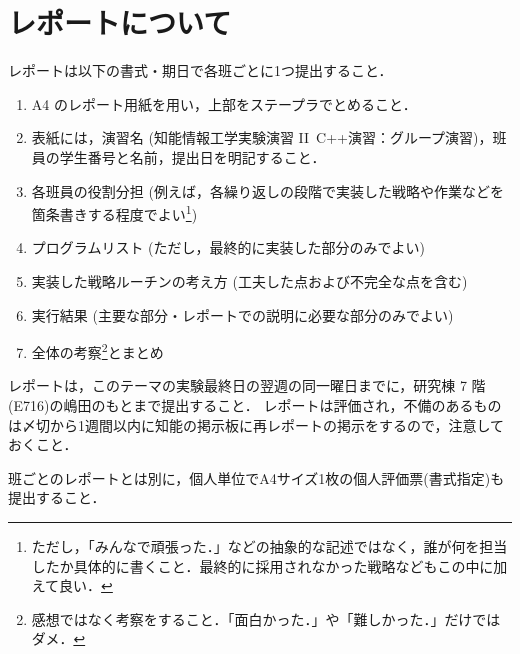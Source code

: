 \section{レポートについて}
レポートは以下の書式・期日で各班ごとに1つ提出すること．
\begin{enumerate}
 \item A4 のレポート用紙を用い，上部をステープラでとめること．\vspace*{-0.5em}
 \item 表紙には，演習名 (知能情報工学実験演習 II\ C++演習：グループ演習)，班員の学生番号と名前，提出日を明記すること．\vspace*{-0.5em}
 \item 各班員の役割分担 (例えば，各繰り返しの段階で実装した戦略や作業などを箇条書きする程度でよい\footnote{ただし，「みんなで頑張った．」などの抽象的な記述ではなく，誰が何を担当したか具体的に書くこと．最終的に採用されなかった戦略などもこの中に加えて良い．})\vspace*{-0.5em}
 \item プログラムリスト (ただし，最終的に実装した部分のみでよい)\vspace*{-0.5em}
 \item 実装した戦略ルーチンの考え方 (工夫した点および不完全な点を含む)\vspace*{-0.5em}
 \item 実行結果 (主要な部分・レポートでの説明に必要な部分のみでよい)\vspace*{-0.5em}
 \item 全体の考察\footnote{感想ではなく考察をすること．「面白かった．」や「難しかった．」だけではダメ．}とまとめ\vspace*{-0.5em}
 \end{enumerate}
レポートは，このテーマの実験最終日の翌週の同一曜日までに，研究棟 7 階(E716)の嶋田のもとまで提出すること．
レポートは評価され，不備のあるものは〆切から1週間以内に知能の掲示板に再レポートの掲示をするので，注意しておくこと．

班ごとのレポートとは別に，個人単位でA4サイズ1枚の個人評価票(書式指定)も提出すること．

